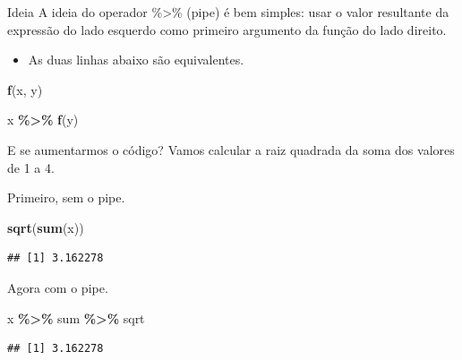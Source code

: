 \documentclass[
  10pt,
  ignorenonframetext,
]{beamer}
\newenvironment{Shaded}{\begin{snugshade}}{\end{snugshade}}
\newcommand{\KeywordTok}[1]{\textcolor[rgb]{0.13,0.29,0.53}{\textbf{#1}}}
\newcommand{\NormalTok}[1]{#1}
\newcommand{\OperatorTok}[1]{\textcolor[rgb]{0.81,0.36,0.00}{\textbf{#1}}}
\newcommand{\StringTok}[1]{\textcolor[rgb]{0.31,0.60,0.02}{#1}}
\providecommand{\tightlist}{%
  \setlength{\itemsep}{0pt}\setlength{\parskip}{0pt}}
\begin{document}
\begin{frame}[fragile]{Ideia}
\protect\hypertarget{ideia}{}
A ideia do operador \%\textgreater\% (pipe) é bem simples: usar o valor
resultante da expressão do lado esquerdo como primeiro argumento da
função do lado direito.

\begin{itemize}
\tightlist
\item
  As duas linhas abaixo são equivalentes.
\end{itemize}

\begin{Shaded}
\begin{Highlighting}[]
\KeywordTok{f}\NormalTok{(x, y)}
\end{Highlighting}
\end{Shaded}

\begin{Shaded}
\begin{Highlighting}[]
\NormalTok{x }\OperatorTok{\%\textgreater{}\%}\StringTok{ }\KeywordTok{f}\NormalTok{(y)}
\end{Highlighting}
\end{Shaded}
\end{frame}

\begin{frame}[fragile]{E se aumentarmos o código?}
\protect\hypertarget{e-se-aumentarmos-o-cuxf3digo}{}
Vamos calcular a raiz quadrada da soma dos valores de 1 a 4.

Primeiro, sem o pipe.

\begin{Shaded}
\begin{Highlighting}[]
\KeywordTok{sqrt}\NormalTok{(}\KeywordTok{sum}\NormalTok{(x))}
\end{Highlighting}
\end{Shaded}

\begin{verbatim}
## [1] 3.162278
\end{verbatim}

Agora com o pipe.

\begin{Shaded}
\begin{Highlighting}[]
\NormalTok{x }\OperatorTok{\%\textgreater{}\%}\StringTok{ }
\StringTok{  }\NormalTok{sum }\OperatorTok{\%\textgreater{}\%}\StringTok{ }
\StringTok{  }\NormalTok{sqrt}
\end{Highlighting}
\end{Shaded}

\begin{verbatim}
## [1] 3.162278
\end{verbatim}
\end{frame}
\end{document}
